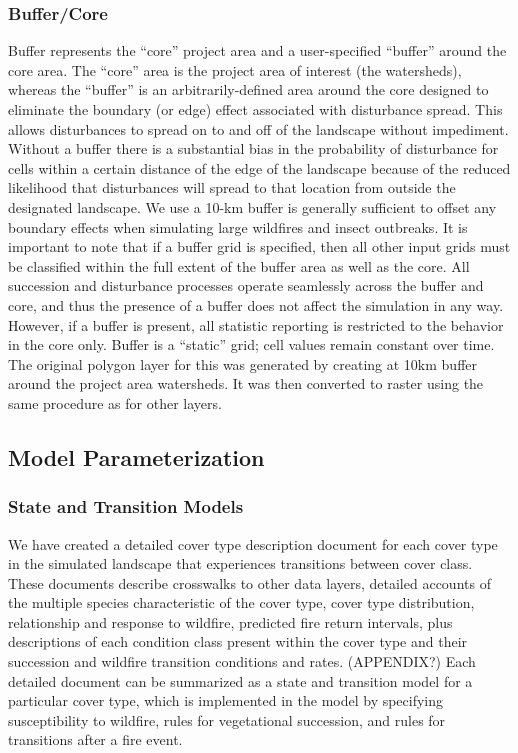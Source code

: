 \subsubsection{Buffer/Core} 
Buffer represents the ``core'' project area and a user-specified ``buffer'' around the core area. The ``core'' area is the project area of interest (the watersheds), whereas the ``buffer'' is an arbitrarily-defined area around the core designed to eliminate the boundary (or edge) effect associated with disturbance spread. This allows disturbances to spread on to and off of the landscape without impediment. Without a buffer there is a substantial bias in the probability of disturbance for cells within a certain distance of the edge of the landscape because of the reduced likelihood that disturbances will spread to that location from outside the designated landscape. We use a 10-km buffer is generally sufficient to offset any boundary effects when simulating large wildfires and insect outbreaks. It is important to note that if a buffer grid is specified, then all other input grids must be classified within the full extent of the buffer area as well as the core. All succession and disturbance processes operate seamlessly across the buffer and core, and thus the presence of a buffer does not affect the simulation in any way. However, if a buffer is present, all statistic reporting is restricted to the behavior in the core only. Buffer is a ``static'' grid; cell values remain constant over time. The original polygon layer for this was generated by creating at 10km buffer around the project area watersheds. It was then converted to raster using the same procedure as for other layers. 



\subsection{Model Parameterization}

\subsubsection{State and Transition Models}
We have created a detailed cover type description document for each cover type in the simulated landscape that experiences transitions between cover class. These documents describe crosswalks to other data layers, detailed accounts of the multiple species characteristic of the cover type, cover type distribution, relationship and response to wildfire, predicted fire return intervals, plus descriptions of each condition class present within the cover type and their succession and wildfire transition conditions and rates. (APPENDIX?) Each detailed document can be summarized as a state and transition model for a particular cover type, which is implemented in the model by specifying susceptibility to wildfire, rules for vegetational succession, and rules for transitions after a fire event. 

